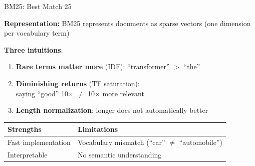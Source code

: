 \documentclass[11pt,compress,t,notes=noshow, xcolor=table]{beamer}
\begin{document}
\begin{frame}{BM25: Best Match 25}

\vfill

\textbf{Representation:} BM25 represents documents as sparse vectors (one dimension per vocabulary term) 

\vfill

\textbf{Three intuitions}:
\begin{enumerate}
    \item \textbf{Rare terms matter more} (IDF): ``transformer'' $>$ ``the''
    \item \textbf{Diminishing returns} (TF saturation):\\
					saying ``good'' 10$\times$ $\neq$ 10$\times$ more relevant
    \item \textbf{Length normalization}: longer docs not automatically better
\end{enumerate}

\vfill

\begin{tabular}{ll}
\toprule
\textbf{Strengths} & \textbf{Limitations} \\
\midrule
Fast implementation & Vocabulary mismatch (``car'' $\neq$ ``automobile'') \\
Interpretable & No semantic understanding \\
\bottomrule
\end{tabular}

\end{frame}

\end{document}
